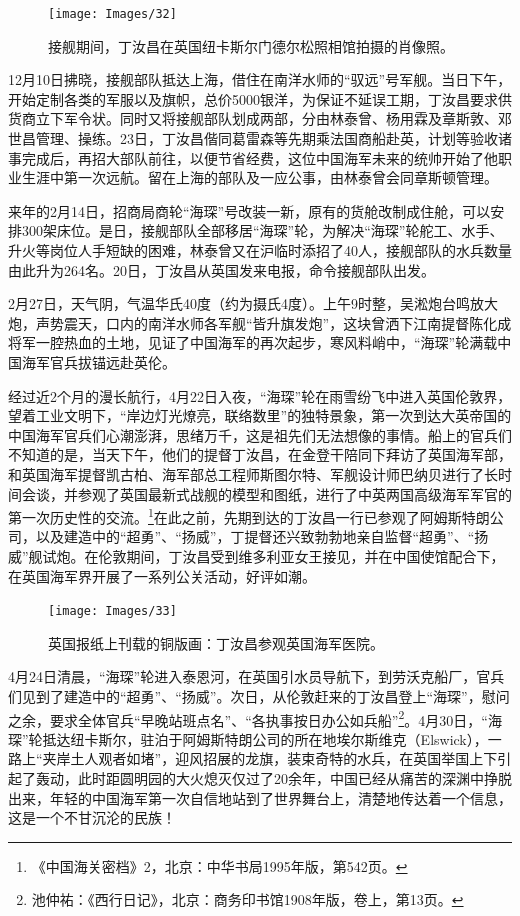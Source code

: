 \documentclass[12pt,UTF8]{ctexbook}
\begin{document}
\begin{figure}[htbp]
	\centering
	\texttt{[image: Images/32]}
	\caption{接舰期间，丁汝昌在英国纽卡斯尔门德尔松照相馆拍摄的肖像照。}
	\label{fig:1}
\end{figure}

12月10日拂晓，接舰部队抵达上海，借住在南洋水师的“驭远”号军舰。当日下午，开始定制各类的军服以及旗帜，总价5000银洋，为保证不延误工期，丁汝昌要求供货商立下军令状。同时又将接舰部队划成两部，分由林泰曾、杨用霖及章斯敦、邓世昌管理、操练。23日，丁汝昌偕同葛雷森等先期乘法国商船赴英，计划等验收诸事完成后，再招大部队前往，以便节省经费，这位中国海军未来的统帅开始了他职业生涯中第一次远航。留在上海的部队及一应公事，由林泰曾会同章斯顿管理。

来年的2月14日，招商局商轮“海琛”号改装一新，原有的货舱改制成住舱，可以安排300架床位。是日，接舰部队全部移居“海琛”轮，为解决“海琛”轮舵工、水手、升火等岗位人手短缺的困难，林泰曾又在沪临时添招了40人，接舰部队的水兵数量由此升为264名。20日，丁汝昌从英国发来电报，命令接舰部队出发。

2月27日，天气阴，气温华氏40度（约为摄氏4度）。上午9时整，吴淞炮台鸣放大炮，声势震天，口内的南洋水师各军舰“皆升旗发炮”，这块曾洒下江南提督陈化成将军一腔热血的土地，见证了中国海军的再次起步，寒风料峭中，“海琛”轮满载中国海军官兵拔锚远赴英伦。

经过近2个月的漫长航行，4月22日入夜，“海琛”轮在雨雪纷飞中进入英国伦敦界，望着工业文明下，“岸边灯光燎亮，联络数里”的独特景象，第一次到达大英帝国的中国海军官兵们心潮澎湃，思绪万千，这是祖先们无法想像的事情。船上的官兵们不知道的是，当天下午，他们的提督丁汝昌，在金登干陪同下拜访了英国海军部，和英国海军提督凯古柏、海军部总工程师斯图尔特、军舰设计师巴纳贝进行了长时间会谈，并参观了英国最新式战舰的模型和图纸，进行了中英两国高级海军军官的第一次历史性的交流。\footnote{《中国海关密档》2，北京：中华书局1995年版，第542页。}在此之前，先期到达的丁汝昌一行已参观了阿姆斯特朗公司，以及建造中的“超勇”、“扬威”，丁提督还兴致勃勃地亲自监督“超勇”、“扬威”舰试炮。在伦敦期间，丁汝昌受到维多利亚女王接见，并在中国使馆配合下，在英国海军界开展了一系列公关活动，好评如潮。

\begin{figure}[htbp]
	\centering
	\texttt{[image: Images/33]}
	\caption{英国报纸上刊载的铜版画：丁汝昌参观英国海军医院。}
	\label{fig:1}
\end{figure}

4月24日清晨，“海琛”轮进入泰恩河，在英国引水员导航下，到劳沃克船厂，官兵们见到了建造中的“超勇”、“扬威”。次日，从伦敦赶来的丁汝昌登上“海琛”，慰问之余，要求全体官兵“早晚站班点名”、“各执事按日办公如兵船”\footnote{池仲祐：《西行日记》，北京：商务印书馆1908年版，卷上，第13页。}。4月30日，“海琛”轮抵达纽卡斯尔，驻泊于阿姆斯特朗公司的所在地埃尔斯维克（Elswick），一路上“夹岸土人观者如堵”，迎风招展的龙旗，装束奇特的水兵，在英国举国上下引起了轰动，此时距圆明园的大火熄灭仅过了20余年，中国已经从痛苦的深渊中挣脱出来，年轻的中国海军第一次自信地站到了世界舞台上，清楚地传达着一个信息，这是一个不甘沉沦的民族！
\end{document}
